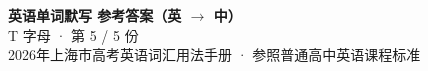 \documentclass[10pt,a4paper]{article}
\begin{document}
\pagestyle{plain}

\begin{center}
{\LARGE\bfseries 英语单词默写 \quad 参考答案（英 $\to$ 中）}\\[0.22em]
{\large T 字母 · 第 5 / 5 份}\\[0.18em]
{\small 2026年上海市高考英语词汇用法手册 · 参照普通高中英语课程标准}
\end{center}

\vspace{0.2em}
\noindent{\color{rulegray}\rule{\textwidth}{0.8pt}}

\vspace{0.35em}

\vspace{0.25em}
\renewcommand{\arraystretch}{1.32}
\end{document}
